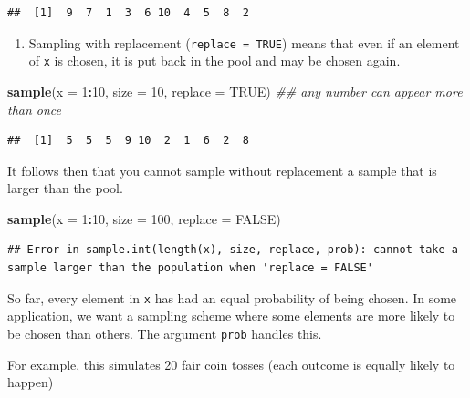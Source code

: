 \documentclass[
]{book}
\newenvironment{Shaded}{\begin{snugshade}}{\end{snugshade}}
\newcommand{\CommentTok}[1]{\textcolor[rgb]{0.56,0.35,0.01}{\textit{#1}}}
\newcommand{\DataTypeTok}[1]{\textcolor[rgb]{0.13,0.29,0.53}{#1}}
\newcommand{\DecValTok}[1]{\textcolor[rgb]{0.00,0.00,0.81}{#1}}
\newcommand{\KeywordTok}[1]{\textcolor[rgb]{0.13,0.29,0.53}{\textbf{#1}}}
\newcommand{\NormalTok}[1]{#1}
\newcommand{\OperatorTok}[1]{\textcolor[rgb]{0.81,0.36,0.00}{\textbf{#1}}}
\newcommand{\OtherTok}[1]{\textcolor[rgb]{0.56,0.35,0.01}{#1}}
\providecommand{\tightlist}{%
  \setlength{\itemsep}{0pt}\setlength{\parskip}{0pt}}
\theoremstyle{definition}
\theoremstyle{definition}
\theoremstyle{definition}
\theoremstyle{definition}
\theoremstyle{remark}
\begin{document}
\begin{verbatim}
##  [1]  9  7  1  3  6 10  4  5  8  2
\end{verbatim}

\begin{enumerate}
\def\labelenumi{\arabic{enumi}.}
\setcounter{enumi}{1}
\tightlist
\item
  Sampling with replacement (\texttt{replace\ =\ TRUE}) means that even if an element of \texttt{x} is chosen, it is put back in the pool and may be chosen again.
\end{enumerate}

\begin{Shaded}
\begin{Highlighting}[]
\KeywordTok{sample}\NormalTok{(}\DataTypeTok{x =} \DecValTok{1}\OperatorTok{:}\DecValTok{10}\NormalTok{, }\DataTypeTok{size =} \DecValTok{10}\NormalTok{, }\DataTypeTok{replace =} \OtherTok{TRUE}\NormalTok{) }\CommentTok{## any number can appear more than once}
\end{Highlighting}
\end{Shaded}

\begin{verbatim}
##  [1]  5  5  5  9 10  2  1  6  2  8
\end{verbatim}

It follows then that you cannot sample without replacement a sample that is larger than the pool.

\begin{Shaded}
\begin{Highlighting}[]
\KeywordTok{sample}\NormalTok{(}\DataTypeTok{x =} \DecValTok{1}\OperatorTok{:}\DecValTok{10}\NormalTok{, }\DataTypeTok{size =} \DecValTok{100}\NormalTok{, }\DataTypeTok{replace =} \OtherTok{FALSE}\NormalTok{)}
\end{Highlighting}
\end{Shaded}

\begin{verbatim}
## Error in sample.int(length(x), size, replace, prob): cannot take a sample larger than the population when 'replace = FALSE'
\end{verbatim}

So far, every element in \texttt{x} has had an equal probability of being chosen. In some application, we want a sampling scheme where some elements are more likely to be chosen than others. The argument \texttt{prob} handles this.

For example, this simulates 20 fair coin tosses (each outcome is equally likely to happen)
\end{document}
